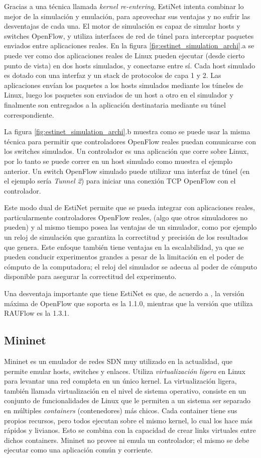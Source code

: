 Gracias a una técnica llamada \textit{kernel re-entering}, EstiNet intenta combinar lo mejor de la simulación y emulación, para aprovechar sus ventajas y no sufrir las desventajas de cada una. El motor de simulación es capaz de simular hosts y switches OpenFlow, y utiliza interfaces de red de túnel para interceptar paquetes enviados entre aplicaciones reales. En la figura \ref{fig:estinet_simulation_archi}.a se puede ver como dos aplicaciones reales de Linux pueden ejecutar (desde cierto punto de vista) en dos hosts simulados, y conectarse entre sí. Cada host simulado es dotado con una interfaz y un stack de protocolos de capa 1 y 2. Las aplicaciones envían los paquetes a los hosts simulados mediante los túneles de Linux, luego los paquetes son enviados de un host a otro en el simulador y finalmente son entregados a la aplicación destinataria mediante su túnel correspondiente.

La figura \ref{fig:estinet_simulation_archi}.b muestra como se puede usar la misma técnica para permitir que controladores OpenFlow reales puedan comunicarse con los switches simulados. Un controlador es una aplicación que corre sobre Linux, por lo tanto se puede correr en un host simulado como muestra el ejemplo anterior. Un switch OpenFlow simulado puede utilizar una interfaz de túnel (en el ejemplo sería \textit{Tunnel 2}) para iniciar una conexión TCP OpenFlow con el controlador.

Este modo dual de EstiNet permite que se pueda integrar con aplicaciones reales, particularmente controladores OpenFlow reales, (algo que otros simuladores no pueden) y al mismo tiempo posea las ventajas de un simulador, como por ejemplo un reloj de simulación que garantiza la correctitud y precisión de los resultados que genera. Este enfoque también tiene ventajas en la escalabilidad, ya que se pueden conducir experimentos grandes a pesar de la limitación en el poder de cómputo de la computadora; el reloj del simulador se adecua al poder de cómputo disponible para asegurar la correctitud del experimento.

Una desventaja importante que tiene EstiNet es que, de acuerdo a \cite{estinet}, la versión máxima de OpenFlow que soporta es la 1.1.0, mientras que la versión que utiliza RAUFlow es la 1.3.1.

\subsection{Mininet}
Mininet \cite{mininet-paper} es un emulador de redes SDN muy utilizado en la actualidad, que permite emular hosts, switches y enlaces. Utiliza \textit{virtualización ligera} en Linux para levantar una red completa en un único kernel. La virtualización ligera, también llamada virtualización en el nivel de sistema operativo, consiste en un conjunto de funcionalidades de Linux que le permiten a un sistema ser separado en múltiples \textit{containers} (contenedores) más chicos. Cada container tiene sus propios recursos, pero todos ejecutan sobre el mismo kernel, lo cual los hace más rápidos y livianos. Esto se combina con la capacidad de crear links virtuales entre dichos containers. Mininet no provee ni emula un controlador; el mismo se debe ejecutar como una aplicación común y corriente.

